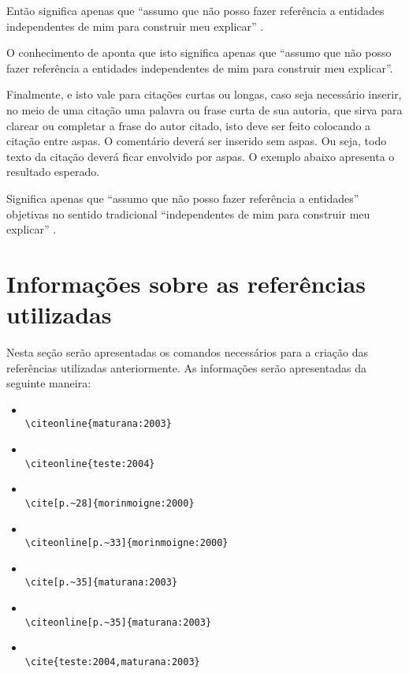 Então significa apenas que ``assumo que não posso fazer referência a entidades independentes de mim para construir meu explicar'' \cite[p.~35]{maturana:2003}.

O conhecimento de  aponta que isto significa apenas que ``assumo que não posso fazer referência a entidades independentes de mim para construir meu explicar''.

Finalmente, e isto vale para citações curtas ou longas, caso seja necessário inserir, no meio de uma citação uma palavra ou frase curta de sua autoria, que sirva para clarear ou completar a frase do autor citado, isto deve ser feito colocando a citação entre aspas.
O comentário deverá ser inserido sem aspas.
Ou seja, todo texto da citação deverá ficar envolvido por aspas.
O exemplo abaixo apresenta o resultado esperado.

Significa apenas que ``assumo que não posso fazer referência a entidades'' objetivas no sentido tradicional ``independentes de mim para construir meu explicar'' {}.

\section{Informações sobre as referências utilizadas}\label{referenciasUtilizadas}

Nesta seção serão apresentadas os comandos necessários para a criação das referências utilizadas anteriormente.
As informações serão apresentadas da seguinte maneira:

\begin{itemize}
    \item {}\\ \verb|\citeonline{maturana:2003}|
    \item {}\\ \verb|\citeonline{teste:2004}|
    \item \cite[p.~28]{morinmoigne:2000}\\ \verb|\cite[p.~28]{morinmoigne:2000}|
    \item {}\\ \verb|\citeonline[p.~33]{morinmoigne:2000}|
    \item \cite[p.~35]{maturana:2003}\\ \verb|\cite[p.~35]{maturana:2003}|
    \item {}\\ \verb|\citeonline[p.~35]{maturana:2003}|
    \item \cite{teste:2004,maturana:2003}\\ \verb|\cite{teste:2004,maturana:2003}|
\end{itemize}
